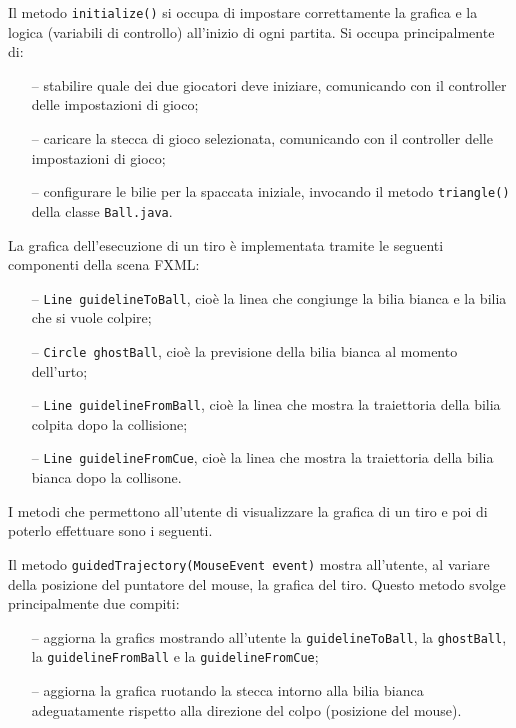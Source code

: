 \documentclass[12pt,a4paper]{report}
\begin{document}
\vspace{3mm}

Il metodo \texttt{initialize()} si occupa di impostare correttamente la grafica e la logica (variabili di controllo) all'inizio di ogni partita.
Si occupa principalmente di:
\begin{itemize}
	\item [--] stabilire quale dei due giocatori deve iniziare, comunicando con il controller delle impostazioni di gioco;
	\item [--] caricare la stecca di gioco selezionata, comunicando con il controller delle impostazioni di gioco;
	\item [--] configurare le bilie per la spaccata iniziale, invocando il metodo \texttt{triangle()} della classe \texttt{Ball.java}.
\end{itemize}

\vspace{3mm}

La grafica dell'esecuzione di un tiro è implementata tramite le seguenti componenti della scena FXML:
\begin{itemize}
	\item [--] \texttt{Line guidelineToBall}, cioè la linea che congiunge la bilia bianca e la bilia che si vuole colpire;
	\item [--] \texttt{Circle ghostBall}, cioè la previsione della bilia bianca al momento dell'urto;
	\item [--] \texttt{Line guidelineFromBall}, cioè la linea che mostra la traiettoria della bilia colpita dopo la collisione;
	\item [--] \texttt{Line guidelineFromCue}, cioè la linea che mostra la traiettoria della bilia bianca dopo la collisone.
\end{itemize}
I metodi che permettono all'utente di visualizzare la grafica di un tiro e poi di poterlo effettuare sono i seguenti.

Il metodo \texttt{guidedTrajectory(MouseEvent event)} mostra all'utente, al variare della posizione del puntatore del mouse, la grafica del tiro.
Questo metodo svolge principalmente due compiti:
\begin{itemize}
	\item [--] aggiorna la grafics mostrando all'utente la \texttt{guidelineToBall}, la \texttt{ghostBall}, la \texttt{guidelineFromBall} e la \texttt{guidelineFromCue};
	\item [--] aggiorna la grafica ruotando la stecca intorno alla bilia bianca adeguatamente rispetto alla direzione del colpo (posizione del mouse).
\end{itemize}
\end{document}
